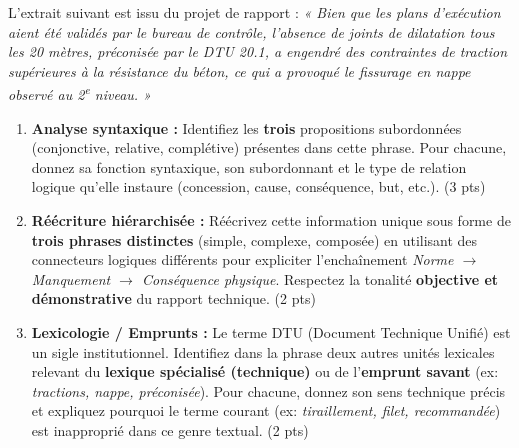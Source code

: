 \documentclass[11pt]{article}
\begin{document}
\begin{exercice}
L'extrait suivant est issu du projet de rapport : \textit{« Bien que les plans d'exécution aient été validés par le bureau de contrôle, l'absence de joints de dilatation tous les 20 mètres, préconisée par le DTU 20.1, a engendré des contraintes de traction supérieures à la résistance du béton, ce qui a provoqué le fissurage en nappe observé au 2\textsuperscript{e} niveau. »}

\begin{enumerate}
    \item \textbf{Analyse syntaxique :} Identifiez les \textbf{trois} propositions subordonnées (conjonctive, relative, complétive) présentes dans cette phrase. Pour chacune, donnez sa fonction syntaxique, son subordonnant et le type de relation logique qu'elle instaure (concession, cause, conséquence, but, etc.). (3 pts)
    \item \textbf{Réécriture hiérarchisée :} Réécrivez cette information unique sous forme de \textbf{trois phrases distinctes} (simple, complexe, composée) en utilisant des connecteurs logiques différents pour expliciter l'enchaînement \textit{Norme $\rightarrow$ Manquement $\rightarrow$ Conséquence physique}. Respectez la tonalité \textbf{objective et démonstrative} du rapport technique. (2 pts)
    \item \textbf{Lexicologie / Emprunts :} Le terme \og DTU \fg{} (Document Technique Unifié) est un sigle institutionnel. Identifiez dans la phrase deux autres unités lexicales relevant du \textbf{lexique spécialisé (technique)} ou de l'\textbf{emprunt savant} (ex: \textit{tractions, nappe, préconisée}). Pour chacune, donnez son sens technique précis et expliquez pourquoi le terme courant (ex: \textit{tiraillement, filet, recommandée}) est inapproprié dans ce genre textual. (2 pts)
\end{enumerate}
\end{exercice}
\end{document}
